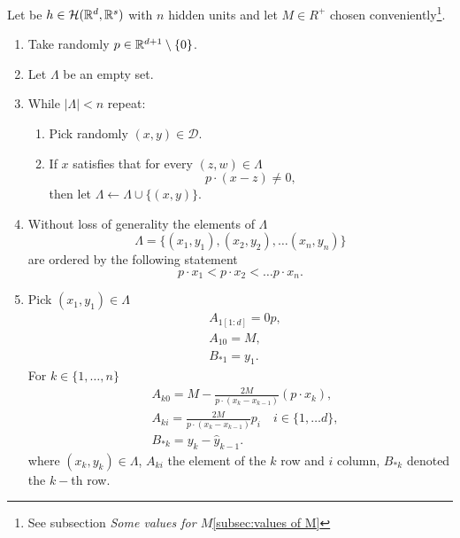 Let be $h \in  \mathcal{H}(\mathbb{R}^d, \mathbb{R}^s)$
 with $n$ hidden units
and let $M \in R^+$ chosen
 conveniently\footnote{See subsection \textit{Some values for $M$}\ref{subsec:values of M}}. 

 \begin{enumerate}
    \item Take randomly $p \in \mathbb{R}^{d+1} \setminus \{0\}$.
    \item Let $\Lambda$ be an empty set. 
    \item While $|\Lambda| < n$ repeat:
    \begin{enumerate}[label=\roman*.]
        \item Pick randomly $(x,y) \in \mathcal{D}$.
        \item If $x$ satisfies that for every $(z,w) \in \Lambda$
        \begin{equation}
            p \cdot (x - z) \neq 0,
        \end{equation}
        then let $\Lambda \gets \Lambda \cup \{(x,y)\}$.
    \end{enumerate}
    \item Without loss of generality the elements of $\Lambda$
    \begin{equation*}
        \Lambda = \{(x_1,y_1), (x_2,y_2), \ldots (x_n, y_n)\}
    \end{equation*}
    are ordered by the following statement
    \begin{equation}
        p \cdot x_1 < p \cdot x_2< \ldots p \cdot x_n.
    \end{equation}
    \item Pick  $(x_1, y_1) \in \Lambda$ \\
    \begin{align*}
        & A_{1  [1:d]} = 0 p, \\ 
         &A_{1 0} = M , \\ 
         & B_{* 1} = y_1.
     \end{align*}
    For $k \in \{1, \ldots, n \}$
     \begin{align*}
         &A_{k 0} = M -  \frac{2 M}{p \cdot (x_k - x_{k-1})}(p \cdot x_{k}),\\
         & A_{k i} = \frac{2 M}{p \cdot (x_k - x_{k-1})}
         p_{i}  \quad i \in \{1, \ldots d\},\\
         & B_{* k} = y_k - \hat y_{k-1}.
     \end{align*} 
     where $(x_k, y_k) \in \Lambda$, $A_{k i}$ the element of the $k$ row and $i$ column, $B_{* k}$ denoted the $k-$th row. 

\end{enumerate}
